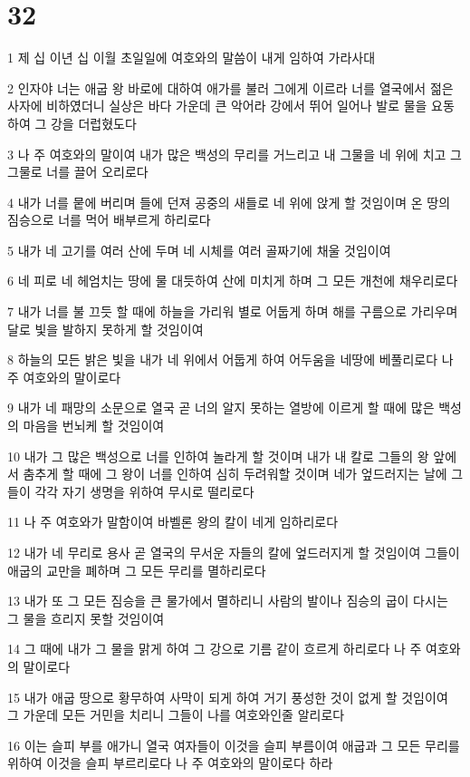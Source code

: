 \chapter{32}

\par 1 제 십 이년 십 이월 초일일에 여호와의 말씀이 내게 임하여 가라사대
\par 2 인자야 너는 애굽 왕 바로에 대하여 애가를 불러 그에게 이르라 너를 열국에서 젊은 사자에 비하였더니 실상은 바다 가운데 큰 악어라 강에서 뛰어 일어나 발로 물을 요동하여 그 강을 더럽혔도다
\par 3 나 주 여호와의 말이여 내가 많은 백성의 무리를 거느리고 내 그물을 네 위에 치고 그 그물로 너를 끌어 오리로다
\par 4 내가 너를 뭍에 버리며 들에 던져 공중의 새들로 네 위에 앉게 할 것임이며 온 땅의 짐승으로 너를 먹어 배부르게 하리로다
\par 5 내가 네 고기를 여러 산에 두며 네 시체를 여러 골짜기에 채울 것임이여
\par 6 네 피로 네 헤엄치는 땅에 물 대듯하여 산에 미치게 하며 그 모든 개천에 채우리로다
\par 7 내가 너를 불 끄듯 할 때에 하늘을 가리워 별로 어둡게 하며 해를 구름으로 가리우며 달로 빛을 발하지 못하게 할 것임이여
\par 8 하늘의 모든 밝은 빛을 내가 네 위에서 어둡게 하여 어두움을 네땅에 베풀리로다 나 주 여호와의 말이로다
\par 9 내가 네 패망의 소문으로 열국 곧 너의 알지 못하는 열방에 이르게 할 때에 많은 백성의 마음을 번뇌케 할 것임이여
\par 10 내가 그 많은 백성으로 너를 인하여 놀라게 할 것이며 내가 내 칼로 그들의 왕 앞에서 춤추게 할 때에 그 왕이 너를 인하여 심히 두려워할 것이며 네가 엎드러지는 날에 그들이 각각 자기 생명을 위하여 무시로 떨리로다
\par 11 나 주 여호와가 말함이여 바벨론 왕의 칼이 네게 임하리로다
\par 12 내가 네 무리로 용사 곧 열국의 무서운 자들의 칼에 엎드러지게 할 것임이여 그들이 애굽의 교만을 폐하며 그 모든 무리를 멸하리로다
\par 13 내가 또 그 모든 짐승을 큰 물가에서 멸하리니 사람의 발이나 짐승의 굽이 다시는 그 물을 흐리지 못할 것임이여
\par 14 그 때에 내가 그 물을 맑게 하여 그 강으로 기름 같이 흐르게 하리로다 나 주 여호와의 말이로다
\par 15 내가 애굽 땅으로 황무하여 사막이 되게 하여 거기 풍성한 것이 없게 할 것임이여 그 가운데 모든 거민을 치리니 그들이 나를 여호와인줄 알리로다
\par 16 이는 슬피 부를 애가니 열국 여자들이 이것을 슬피 부름이여 애굽과 그 모든 무리를 위하여 이것을 슬피 부르리로다 나 주 여호와의 말이로다 하라
